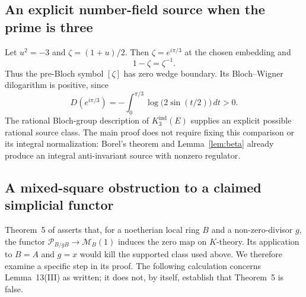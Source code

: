 \documentclass[11pt,a4paper]{article}
\theoremstyle{remark}
\begin{document}
\subsection{An explicit number-field source when the prime is three}
Let $u^2=-3$ and $\zeta=(1+u)/2$. Then $\zeta=e^{i\pi/3}$ at the chosen embedding and
\[
1-\zeta=\zeta^{-1}.
\]
Thus the pre-Bloch symbol $[\zeta]$ has zero wedge boundary. Its Bloch--Wigner dilogarithm is positive, since
\[
D(e^{i\pi/3})=-\int_0^{\pi/3}\log\bigl(2\sin(t/2)\bigr)\,dt>0.
\]
The rational Bloch-group description of $K_3^{\mathrm{ind}}(E)$ supplies an explicit possible rational source class. The main proof does not require fixing this comparison or its integral normalization: Borel's theorem and Lemma~\ref{lem:beta} already produce an integral anti-invariant source with nonzero regulator.

\subsection{A mixed-square obstruction to a claimed simplicial functor}
\label{sec:mochizukisquare}

Theorem~5 of \cite{MochizukiParameters} asserts that, for a noetherian
local ring $B$ and a non-zero-divisor $g$, the functor
$\mathcal P_{B/gB}\to\mathcal M_B(1)$ induces the zero map on
$K$-theory. Its application to $B=A$ and $g=x$ would kill the supported
class used above. We therefore examine a specific step in its proof.
The following calculation concerns Lemma~13(III) as written; it does
not, by itself, establish that Theorem~5 is false.
\end{document}
